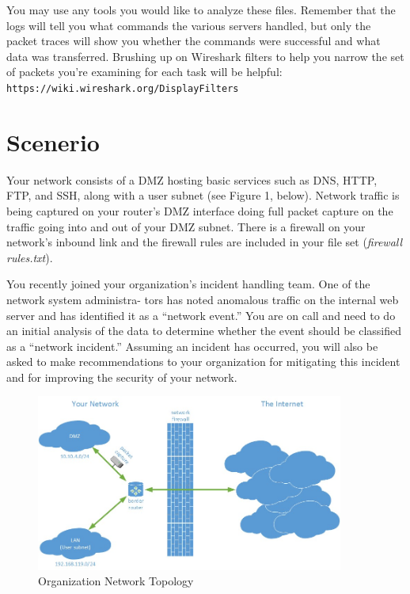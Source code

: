 \documentclass{article}
\begin{document}
You may use any tools you would like to analyze these files. Remember that the logs will tell you what commands the various servers handled, but only the packet traces will show you whether the commands were successful and what data was transferred. Brushing up on Wireshark filters to help you narrow the set of packets you're examining for each task will be helpful:\\
{\tt https://wiki.wireshark.org/DisplayFilters}

\section{Scenerio}

Your network consists of a DMZ hosting basic services such as DNS, HTTP, FTP, and SSH, along with a user subnet (see Figure 1, below). Network traffic is being captured on your router's DMZ interface doing full packet capture on the traffic going into and out of your DMZ subnet. There is a firewall on your network's inbound link and the firewall rules are included in your file set (\textit{firewall rules.txt}).


You recently joined your organization's incident handling team. One of the network system administra- tors has noted anomalous traffic on the internal web server and has identified it as a ``network event.'' You are on call and need to do an initial analysis of the data to determine whether the event should be classified as a ``network incident.'' Assuming an incident has occurred, you will also be asked to make recommendations to your organization for mitigating this incident and for improving the security of your network.


\begin{figure}[!htb]
\centering
\includegraphics*
[width=0.9\textwidth]
{topo.png}
\caption{Organization Network Topology} 
\label{fig:environment}
\end{figure}
\end{document}
